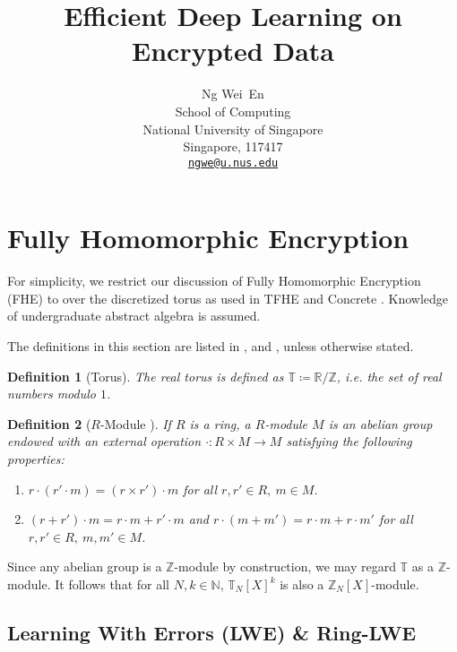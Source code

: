 \documentclass{article}
\title{Efficient Deep Learning on Encrypted Data}
\author{
  Ng Wei~En \\
  School of Computing \\
  National University of Singapore \\
  Singapore, 117417 \\
  \texttt{\href{mailto:ngwe@u.nus.edu}{ngwe@u.nus.edu}}
}
\newtheorem{definition}{Definition}
\begin{document}
\maketitle



\section{Fully Homomorphic Encryption}

For simplicity, we restrict our discussion of Fully Homomorphic Encryption (FHE) to over
the discretized torus as used in TFHE \cite{chillotti2020tfhe} and Concrete
\cite{chillotti2020concrete}. Knowledge of undergraduate abstract algebra is assumed.

The definitions in this section are listed in \cite{chillotti2020tfhe},
\cite{chillotti2020concrete} and \cite{joye2021guide}, unless otherwise stated.

\begin{definition}[Torus]
  The real torus is defined as $\mathbb{T} \coloneqq \mathbb{R}/\mathbb{Z}$, i.e. the
  set of real numbers modulo $1$.
\end{definition}

\begin{definition}[$R$-Module \cite{knapp2006basic}]
  If $R$ is a ring, a $R$-module $M$ is an abelian group endowed with an external
  operation $\cdot: R \times M \to M$ satisfying the following properties:
  \begin{enumerate}
    \item $r \cdot (r' \cdot m) = (r \times r') \cdot m$ for all $r, r' \in R,\ m \in
      M$.
    \item $(r + r') \cdot m = r \cdot m + r' \cdot m$ and $r \cdot (m + m') = r \cdot m
      + r \cdot m'$ for all $r, r' \in R,\ m, m' \in M$.
  \end{enumerate}
\end{definition}

Since any abelian group is a $\mathbb{Z}$-module by construction, we may regard
$\mathbb{T}$ as a $\mathbb{Z}$-module. It follows that for all $N, k \in \mathbb{N}$,
$\mathbb{T}_N[X]^k$ is also a $\mathbb{Z}_N[X]$-module.

\subsection{Learning With Errors (LWE) \& Ring-LWE}
\end{document}
